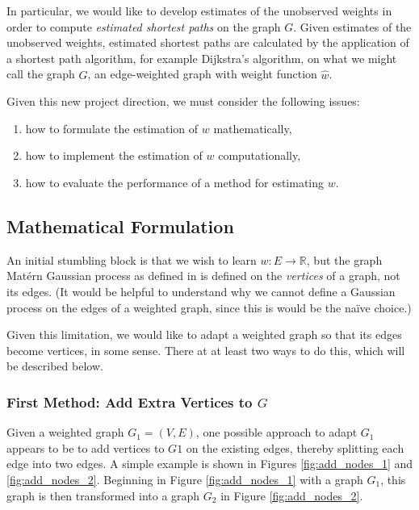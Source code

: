 In particular, we would like to develop estimates of the unobserved weights in order to compute \textit{estimated shortest paths} on the graph $G$. Given estimates of the unobserved weights, estimated shortest paths are calculated by the application of a shortest path algorithm, for example Dijkstra's algorithm, on what we might call the graph $\hat G$, an edge-weighted graph with weight function $\hat w$.

Given this new project direction, we must consider the following issues:

\begin{enumerate}
    \item how to formulate the estimation of $w$ mathematically,
    \item how to implement the estimation of $w$ computationally,
    \item how to evaluate the performance of a method for estimating $w$.
\end{enumerate}

\subsection{Mathematical Formulation}

An initial stumbling block is that we wish to learn $w \colon E \to \mathbb R$, but the graph Mat\'{e}rn Gaussian process as defined in \cite{pmlr-v130-borovitskiy21a} is defined on the \textit{vertices} of a graph, not its edges. (It would be helpful to understand why we cannot define a Gaussian process on the edges of a weighted graph, since this is would be the na\"{i}ve choice.)

Given this limitation, we would like to adapt a weighted graph so that its edges become vertices, in some sense. There at at least two ways to do this, which will be described below.

\subsubsection{First Method: Add Extra Vertices to \texorpdfstring{$G$}{G}}

Given a weighted graph $G_1 = (V, E)$, one possible approach to adapt $G_1$ appears to be to add vertices to $G1$ on the existing edges, thereby splitting each edge into two edges. A simple example is shown in Figures \ref{fig:add_nodes_1} and \ref{fig:add_nodes_2}. Beginning in Figure \ref{fig:add_nodes_1} with a graph $G_1$, this graph is then transformed into a graph $G_2$ in Figure \ref{fig:add_nodes_2}.

